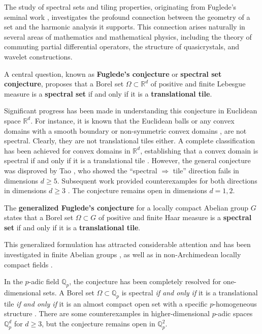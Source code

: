 \documentclass[a4paper,12pt]{amsart}
\def\Q{\mathbb{Q}}
\def\Qp{\mathbb{Q}_p}
\begin{document}
The study of spectral sets and tiling properties, originating from Fuglede's seminal work \cite{Fuglede1974},
investigates the profound connection between the geometry of a set and the harmonic analysis it supports.
This connection arises naturally in several areas of mathematics and mathematical physics, including the
theory of commuting partial differential operators, the structure of quasicrystals, and  wavelet constructions.

A central question, known as \textbf{Fuglede's conjecture} or \textbf{spectral set conjecture}, proposes that a Borel set $\Omega\subset\mathbb{R}^d$ of positive and finite Lebesgue measure is
  a \textbf{spectral set} if and only if it is a \textbf{translational tile}.

Significant progress has been made in understanding this conjecture in Euclidean space $\mathbb{R}^d$.
For instance, it is known that the Euclidean balls \cite{Fuglede2001} or any convex domains with a smooth
boundary \cite{Iosevich-Katz-Tao} or non-symmetric convex domains \cite{K2000}, are not spectral. Clearly,
they are not translational tiles either. A complete classification has been achieved for convex domains in $\mathbb{R}^d$,
establishing that a convex domain is spectral if and only if it is a translational tile \cite{Iosevich-Katz-Tao2008, LM21}.
However, the general conjecture was disproved by Tao \cite{Tao2004}, who showed the ``spectral $\Rightarrow$ tile''
direction fails in dimensions $d \geq 5$. Subsequent work provided counterexamples for both directions in dimensions $d \geq 3$ \cite{FMM2006,KM2006,KM2006a,Matolcsi2005}.
The conjecture remains open in dimensions $d =1, 2$.

The \textbf{generalized  Fuglede's conjecture} for a locally compact Abelian group $G$
states that a Borel set $\Omega\subset G$ of positive and finite Haar measure is a \textbf{spectral set}
if and only if it is a \textbf{translational tile}.

This generalized formulation has attracted considerable attention and has been investigated in finite
Abelian groups \cite{AIMP2015, IMP17, KMSV20, KMSV22, KS21, MK17, S19, S20, Somlai21},
as well as in non-Archimedean locally compact fields
\cite{Fan,Fan-Fan-Shi,Fan-Fan-Liao-Shi,Kadir}.

In the $p$-adic field $\Qp$, the conjecture has been completely resolved for one-dimensional sets.
A Borel set $\Omega \subset \mathbb{Q}_p$ is spectral \textit{if and only if} it is a translational
tile \textit{if and only if}  it is an almost compact open set with a specific $p$-homogeneous structure
 \cite{Fan-Fan-Shi,Fan-Fan-Liao-Shi}.
There are some counterexamples in higher-dimensional $p$-adic spaces $\mathbb{Q}_p^{d}$ for $d \geq 3$,
but the conjecture remains open in $\Q_p^2$.
\end{document}
